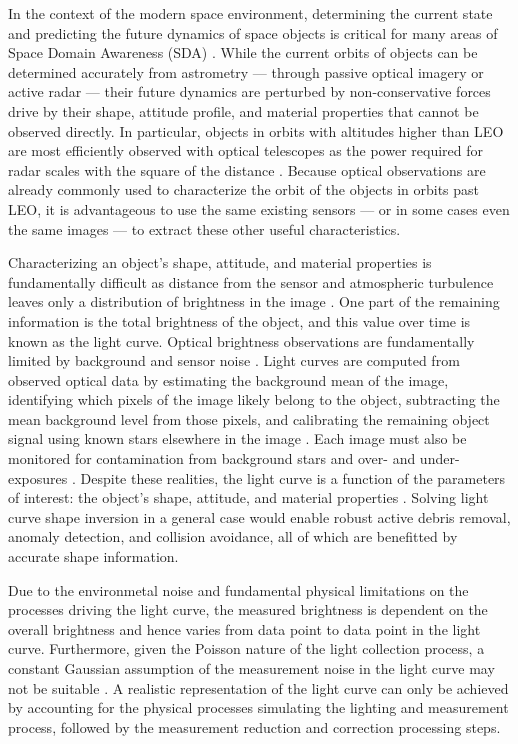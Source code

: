 In the context of the modern space environment, determining the current state and predicting the future dynamics of space objects is critical for many areas of Space Domain Awareness (SDA) \cite{frueh2019notes}. While the current orbits of objects can be determined accurately from astrometry --- through passive optical imagery or active radar --- their future dynamics are perturbed by non-conservative forces drive by their shape, attitude profile, and material properties that cannot be observed directly. In particular, objects in orbits with altitudes higher than LEO are most efficiently observed with optical telescopes as the power required for radar scales with the square of the distance \cite{frueh2019notes}. Because optical observations are already commonly used to characterize the orbit of the objects in orbits past LEO, it is advantageous to use the same existing sensors --- or in some cases even the same images --- to extract these other useful characteristics. 

Characterizing an object's shape, attitude, and material properties is fundamentally difficult as distance from the sensor and atmospheric turbulence leaves only a distribution of brightness in the image \cite{fan2020thesis}. One part of the remaining information is the total brightness of the object, and this value over time is known as the light curve. Optical brightness observations are fundamentally limited by background and sensor noise \cite{frueh2019notes}. Light curves are computed from observed optical data by estimating the background mean of the image, identifying which pixels of the image likely belong to the object, subtracting the mean background level from those pixels, and calibrating the remaining object signal using known stars elsewhere in the image \cite{schildknecht2008}. Each image must also be monitored for contamination from background stars and over- and under-exposures \cite{schildknecht2015}. Despite these realities, the light curve is a function of the parameters of interest: the object's shape, attitude, and material properties \cite{fan2020thesis, burton2021mapping}. Solving light curve shape inversion in a general case would enable robust active debris removal, anomaly detection, and collision avoidance, all of which are benefitted by accurate shape information.

Due to the environmetal noise and fundamental physical limitations on the processes driving the light curve, the measured brightness is dependent on the overall brightness and hence varies from data point to data point in the light curve. Furthermore, given the Poisson nature of the light collection process, a constant Gaussian assumption of the measurement noise in the light curve may not be suitable \cite{fan2020thesis, krag2003}. A realistic representation of the light curve can only be achieved by accounting for the physical processes simulating the lighting and measurement process, followed by the measurement reduction and correction processing steps. 

